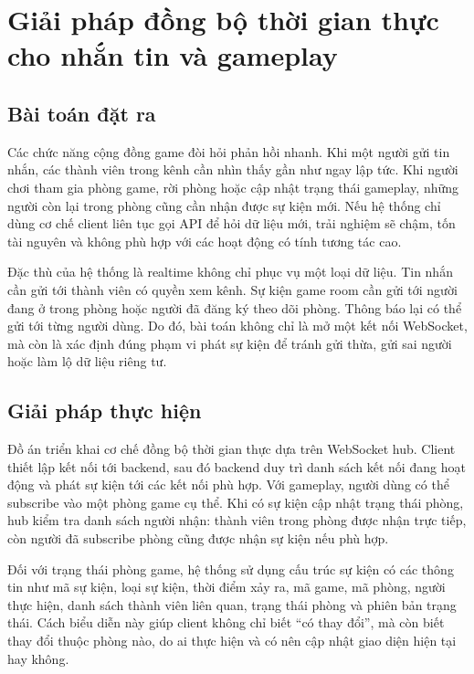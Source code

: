 \documentclass[../DoAn.tex]{subfiles}
\begin{document}
\section{Giải pháp đồng bộ thời gian thực cho nhắn tin và gameplay}
\label{section:5.3}

\subsection{Bài toán đặt ra}
\label{subsection:5.3.1}

Các chức năng cộng đồng game đòi hỏi phản hồi nhanh. Khi một người gửi tin nhắn, các thành viên trong kênh cần nhìn thấy gần như ngay lập tức. Khi người chơi tham gia phòng game, rời phòng hoặc cập nhật trạng thái gameplay, những người còn lại trong phòng cũng cần nhận được sự kiện mới. Nếu hệ thống chỉ dùng cơ chế client liên tục gọi API để hỏi dữ liệu mới, trải nghiệm sẽ chậm, tốn tài nguyên và không phù hợp với các hoạt động có tính tương tác cao.

Đặc thù của hệ thống là realtime không chỉ phục vụ một loại dữ liệu. Tin nhắn cần gửi tới thành viên có quyền xem kênh. Sự kiện game room cần gửi tới người đang ở trong phòng hoặc người đã đăng ký theo dõi phòng. Thông báo lại có thể gửi tới từng người dùng. Do đó, bài toán không chỉ là mở một kết nối WebSocket, mà còn là xác định đúng phạm vi phát sự kiện để tránh gửi thừa, gửi sai người hoặc làm lộ dữ liệu riêng tư.

\subsection{Giải pháp thực hiện}
\label{subsection:5.3.2}

Đồ án triển khai cơ chế đồng bộ thời gian thực dựa trên WebSocket hub. Client thiết lập kết nối tới backend, sau đó backend duy trì danh sách kết nối đang hoạt động và phát sự kiện tới các kết nối phù hợp. Với gameplay, người dùng có thể subscribe vào một phòng game cụ thể. Khi có sự kiện cập nhật trạng thái phòng, hub kiểm tra danh sách người nhận: thành viên trong phòng được nhận trực tiếp, còn người đã subscribe phòng cũng được nhận sự kiện nếu phù hợp.

Đối với trạng thái phòng game, hệ thống sử dụng cấu trúc sự kiện có các thông tin như mã sự kiện, loại sự kiện, thời điểm xảy ra, mã game, mã phòng, người thực hiện, danh sách thành viên liên quan, trạng thái phòng và phiên bản trạng thái. Cách biểu diễn này giúp client không chỉ biết “có thay đổi”, mà còn biết thay đổi thuộc phòng nào, do ai thực hiện và có nên cập nhật giao diện hiện tại hay không.
\end{document}
